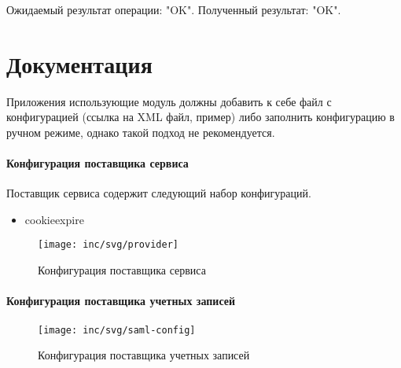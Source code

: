 Ожидаемый результат операции: "OK". 
Полученный результат: "OK".

%
%

\section{Документация}

Приложения использующие модуль должны добавить к себе файл с конфигурацией (ссылка на XML файл, пример) либо заполнить конфигурацию в ручном режиме, однако такой подход не рекомендуется.

\paragraph{Конфигурация поставщика сервиса}
Поставщик сервиса содержит следующий набор конфигураций.
\begin{itemize}
\item cookieexpire
\end{itemize}

\begin{figure}[H]
  \centering
  \texttt{[image: inc/svg/provider]}
  \caption{Конфигурация поставщика сервиса}
  \label{fig:runConfig}
\end{figure}

\paragraph{Конфигурация поставщика учетных записей}

\begin{figure}[H]
  \centering
  \texttt{[image: inc/svg/saml-config]}
  \caption{Конфигурация поставщика учетных записей}
  \label{fig:samlConfig}
\end{figure}



